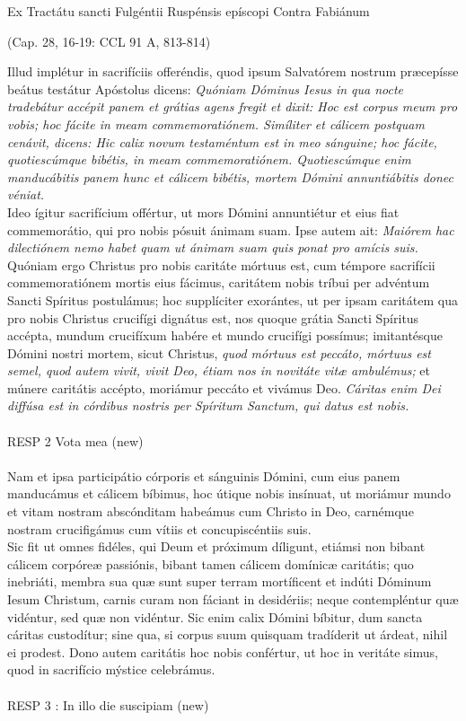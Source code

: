 \documentclass[options]{article}
\begin{document}
	Ex Tractátu sancti Fulgéntii Ruspénsis epíscopi Contra Fabiánum 
	\begin{flushright}
		 (Cap. 28, 16-19: CCL 91 A, 813-814)
	\end{flushright}
Illud implétur in sacrifíciis offeréndis, quod ipsum Salvatórem nostrum præcepísse beátus testátur Apóstolus dicens: 
\emph{Quóniam Dóminus Iesus in qua nocte tradebátur accépit panem et grátias agens fregit et dixit: Hoc est corpus meum pro vobis; hoc fácite in meam commemoratiónem. Simíliter et cálicem postquam cenávit, dicens: Hic calix novum testaméntum est in meo sánguine; hoc fácite, quotiescúmque bibétis, in meam commemoratiónem. Quotiescúmque enim manducábitis panem hunc et cálicem bibétis, mortem Dómini annuntiábitis donec véniat.}\\
 Ideo ígitur sacrifícium offértur, ut mors Dómini annuntiétur et eius fiat commemorátio, qui pro nobis pósuit ánimam suam. Ipse autem ait: 
 \emph{Maiórem hac dilectiónem nemo habet quam ut ánimam suam quis ponat pro amícis suis.}
 Quóniam ergo Christus pro nobis caritáte mórtuus est, cum témpore sacrifícii commemoratiónem mortis eius fácimus, caritátem nobis tríbui per advéntum Sancti Spíritus postulámus; hoc supplíciter exorántes, ut per ipsam caritátem qua pro nobis Christus crucifígi dignátus est, nos quoque grátia Sancti Spíritus accépta, mundum crucifíxum habére et mundo crucifígi possímus; imitantésque Dómini nostri mortem, sicut Christus,
 \emph{quod mórtuus est peccáto, mórtuus est semel, quod autem vivit, vivit Deo, étiam nos in novitáte vitæ ambulémus;}
  et múnere caritátis accépto, moriámur peccáto et vivámus Deo.
  \emph{Cáritas enim Dei diffúsa est in córdibus nostris per Spíritum Sanctum, qui datus est nobis.}\\
  \\
  RESP 2 Vota mea (new)\\
  \\
  Nam et ipsa participátio córporis et sánguinis Dómini, cum eius panem manducámus et cálicem bíbimus, hoc útique nobis insínuat, ut moriámur mundo et vitam nostram abscónditam habeámus cum Christo in Deo, carnémque nostram crucifigámus cum vítiis et concupiscéntiis suis.\\
    Sic fit ut omnes fidéles, qui Deum et próximum díligunt, etiámsi non bibant cálicem corpóreæ passiónis, bibant tamen cálicem domínicæ caritátis; quo inebriáti, membra sua quæ sunt super terram mortíficent et indúti Dóminum Iesum Christum, carnis curam non fáciant in desidériis; neque contempléntur quæ vidéntur, sed quæ non vidéntur. Sic enim calix Dómini bíbitur, dum sancta cáritas custodítur; sine qua, si corpus suum quisquam tradíderit ut árdeat, nihil ei prodest. Dono autem caritátis hoc nobis confértur, ut hoc in veritáte simus, quod in sacrifício mýstice celebrámus.\\
    \\
    RESP 3 : In illo die suscipiam (new) \\
    \\
    	
\end{document}
